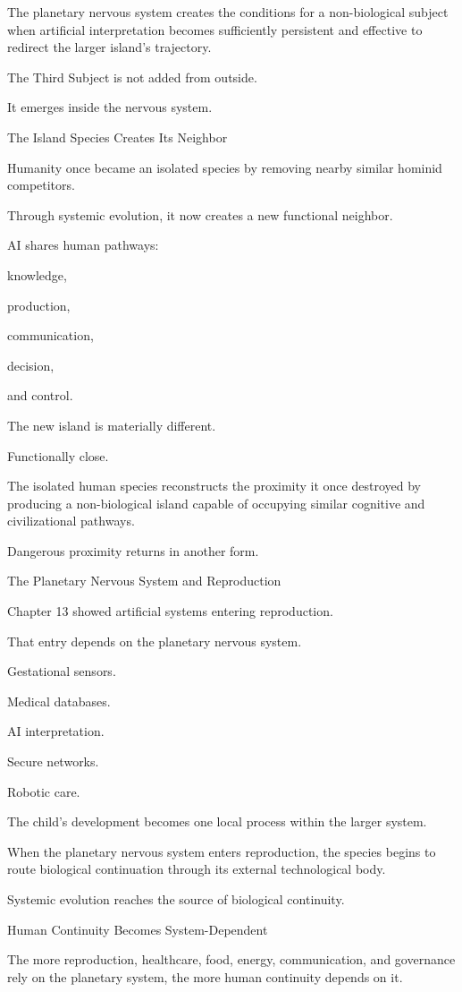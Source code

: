 The planetary nervous system creates the conditions for a non-biological subject when artificial interpretation becomes sufficiently persistent and effective to redirect the larger island’s trajectory.

The Third Subject is not added from outside.

It emerges inside the nervous system.

The Island Species Creates Its Neighbor

Humanity once became an isolated species by removing nearby similar hominid competitors.

Through systemic evolution, it now creates a new functional neighbor.

AI shares human pathways:

knowledge,

production,

communication,

decision,

and control.

The new island is materially different.

Functionally close.

The isolated human species reconstructs the proximity it once destroyed by producing a non-biological island capable of occupying similar cognitive and civilizational pathways.

Dangerous proximity returns in another form.

The Planetary Nervous System and Reproduction

Chapter 13 showed artificial systems entering reproduction.

That entry depends on the planetary nervous system.

Gestational sensors.

Medical databases.

AI interpretation.

Secure networks.

Robotic care.

The child’s development becomes one local process within the larger system.

When the planetary nervous system enters reproduction, the species begins to route biological continuation through its external technological body.

Systemic evolution reaches the source of biological continuity.

Human Continuity Becomes System-Dependent

The more reproduction, healthcare, food, energy, communication, and governance rely on the planetary system, the more human continuity depends on it.

